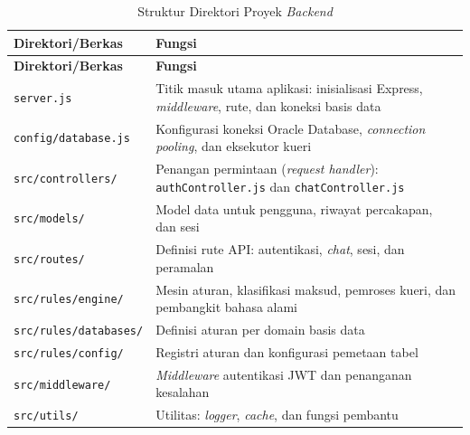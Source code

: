 \begin{longtable}{|p{4.5cm}|p{8.5cm}|}
\caption{Struktur Direktori Proyek \textit{Backend}} \label{tab:struktur-backend} \\
\hline
\textbf{Direktori/Berkas} & \textbf{Fungsi} \\
\hline
\endfirsthead
\hline
\textbf{Direktori/Berkas} & \textbf{Fungsi} \\
\hline
\endhead
\hline
\endfoot
\texttt{server.js} & Titik masuk utama aplikasi: inisialisasi Express, \textit{middleware}, rute, dan koneksi basis data \\
\hline
\texttt{config/database.js} & Konfigurasi koneksi Oracle Database, \textit{connection pooling}, dan eksekutor kueri \\
\hline
\texttt{src/controllers/} & Penangan permintaan (\textit{request handler}): \texttt{authController.js} dan \texttt{chatController.js} \\
\hline
\texttt{src/models/} & Model data untuk pengguna, riwayat percakapan, dan sesi \\
\hline
\texttt{src/routes/} & Definisi rute API: autentikasi, \textit{chat}, sesi, dan peramalan \\
\hline
\texttt{src/rules/engine/} & Mesin aturan, klasifikasi maksud, pemroses kueri, dan pembangkit bahasa alami \\
\hline
\texttt{src/rules/databases/} & Definisi aturan per domain basis data \\
\hline
\texttt{src/rules/config/} & Registri aturan dan konfigurasi pemetaan tabel \\
\hline
\texttt{src/middleware/} & \textit{Middleware} autentikasi JWT dan penanganan kesalahan \\
\hline
\texttt{src/utils/} & Utilitas: \textit{logger}, \textit{cache}, dan fungsi pembantu \\
\hline
\end{longtable}
